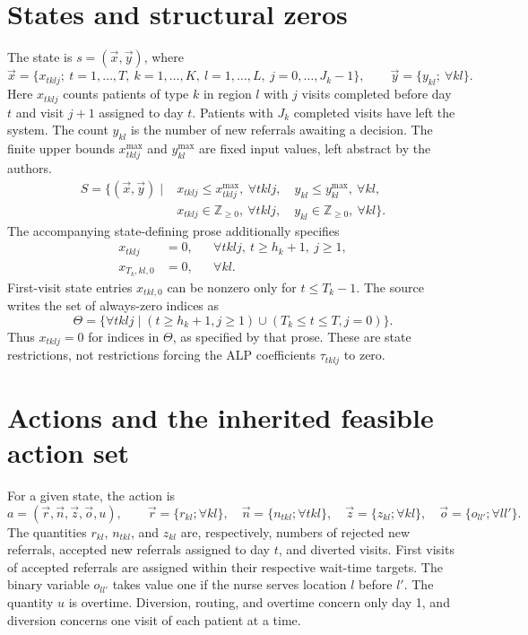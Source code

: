 \documentclass{article}
\begin{document}
\section*{States and structural zeros}
The state is $s=(\vec x,\vec y)$, where
\[
\vec x=\{x_{tklj};\ t=1,\ldots,T,\ k=1,\ldots,K,\ l=1,\ldots,L,\ j=0,\ldots,J_k-1\},
\qquad
\vec y=\{y_{kl};\ \forall kl\}.
\]
Here $x_{tklj}$ counts patients of type $k$ in region $l$ with $j$ visits completed before day $t$ and visit $j+1$ assigned to day $t$. Patients with $J_k$ completed visits have left the system. The count $y_{kl}$ is the number of new referrals awaiting a decision. The finite upper bounds $x^{\max}_{tklj}$ and $y^{\max}_{kl}$ are fixed input values, left abstract by the authors.
\begin{equation}
\begin{split}
S=\{(\vec x,\vec y)\mid{}&x_{tklj}\leq x^{\max}_{tklj},\ \forall tklj,
\quad y_{kl}\leq y^{\max}_{kl},\ \forall kl,\\
&x_{tklj}\in\mathbb Z_{\geq0},\ \forall tklj,
\quad y_{kl}\in\mathbb Z_{\geq0},\ \forall kl\}.
\end{split}\tag{1}
\end{equation}
The accompanying state-defining prose additionally specifies
\begin{align*}
x_{tklj}&=0,&&\forall tklj,\ t\geq h_k+1,\ j\geq1,\\
x_{T_k,kl,0}&=0,&&\forall kl.
\end{align*}
First-visit state entries $x_{tkl,0}$ can be nonzero only for $t\leq T_k-1$. The source writes the set of always-zero indices as
\[
\Theta=\{\forall tklj\mid(t\geq h_k+1,j\geq1)\cup(T_k\leq t\leq T,j=0)\}.
\]
Thus $x_{tklj}=0$ for indices in $\Theta$, as specified by that prose. These are state restrictions, not restrictions forcing the ALP coefficients $\tau_{tklj}$ to zero.

\section*{Actions and the inherited feasible action set}
For a given state, the action is
\[
a=(\vec r,\vec n,\vec z,\vec o,u),\qquad
\vec r=\{r_{kl};\forall kl\},\quad
\vec n=\{n_{tkl};\forall tkl\},\quad
\vec z=\{z_{kl};\forall kl\},\quad
\vec o=\{o_{ll'};\forall ll'\}.
\]
The quantities $r_{kl}$, $n_{tkl}$, and $z_{kl}$ are, respectively, numbers of rejected new referrals, accepted new referrals assigned to day $t$, and diverted visits. First visits of accepted referrals are assigned within their respective wait-time targets. The binary variable $o_{ll'}$ takes value one if the nurse serves location $l$ before $l'$. The quantity $u$ is overtime. Diversion, routing, and overtime concern only day 1, and diversion concerns one visit of each patient at a time.
\end{document}
